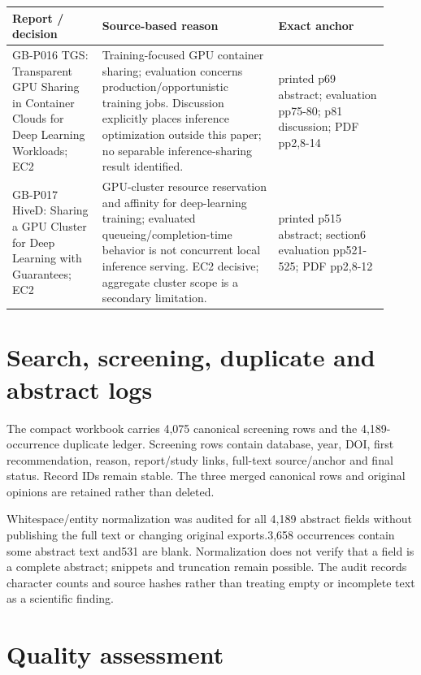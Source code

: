 \documentclass[12pt,a4paper]{article}
\begin{document}
{\small\begin{longtable}{>{\raggedright\arraybackslash}p{0.22\linewidth}>{\raggedright\arraybackslash}p{0.43\linewidth}>{\raggedright\arraybackslash}p{0.27\linewidth}}
\toprule
Report /\allowbreak{} decision & Source-based reason & Exact anchor\\\midrule
\endhead
GB-P016 TGS:\allowbreak{} Transparent GPU Sharing in Container Clouds for Deep Learning Workloads; EC2 & Training-focused GPU container sharing; evaluation concerns production/\allowbreak{}opportunistic training jobs. Discussion explicitly places inference optimization outside this paper; no separable inference-sharing result identified. & printed p69 abstract; evaluation pp75-80; p81 discussion; PDF pp2,8-14\\
GB-P017 HiveD:\allowbreak{} Sharing a GPU Cluster for Deep Learning with Guarantees; EC2 & GPU-cluster resource reservation and affinity for deep-learning training; evaluated queueing/\allowbreak{}completion-time behavior is not concurrent local inference serving. EC2 decisive; aggregate cluster scope is a secondary limitation. & printed p515 abstract; section6 evaluation pp521-525; PDF pp2,8-12\\
\bottomrule
\end{longtable}}


\section{Search, screening, duplicate and abstract logs}

The compact workbook carries 4,075 canonical screening rows and the 4,189-occurrence duplicate ledger. Screening rows contain database, year, DOI, first recommendation, reason, report/\allowbreak{}study links, full-text source/\allowbreak{}anchor and final status. Record IDs remain stable. The three merged canonical rows and original opinions are retained rather than deleted.


Whitespace/\allowbreak{}entity normalization was audited for all 4,189 abstract fields without publishing the full text or changing original exports.3,658 occurrences contain some abstract text and531 are blank. Normalization does not verify that a field is a complete abstract; snippets and truncation remain possible. The audit records character counts and source hashes rather than treating empty or incomplete text as a scientific finding.



\section{Quality assessment}
\end{document}
